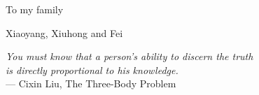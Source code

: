 %
\begin{frontmatter}

    \makefrontmatter

    \begin{dedication}
        \vspace*{\fill}
        To my family \par Xiaoyang, Xiuhong and Fei \par
        \vspace*{\fill}
    \end{dedication}





    \begin{epigraph} %

        \emph{
            You must know that a person’s ability to discern the truth \\
            is directly proportional to his knowledge.
        }\\
        --- Cixin Liu, The Three-Body Problem \par


\end{epigraph}
\end{frontmatter}

